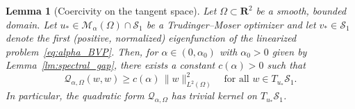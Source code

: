 \documentclass[reqno,11pt]{amsart}
\newtheorem{lemma}[theorem]{Lemma}
\theoremstyle{definition}
\begin{document}
\begin{lemma}[Coercivity on the tangent space]\label{lem:Q_coercivity}
Let $\Omega\subset\mathbf{R}^2$ be a smooth, bounded domain.
Let $u_*\in\mathcal{M}_\alpha(\Omega)\cap\mathcal{S}_1$ be a Trudinger--Moser optimizer and
let $v_*\in\mathcal{S}_1$ denote the first (positive, normalized) eigenfunction
of the linearized problem~\eqref{eq:alpha_BVP}.
Then, for $\alpha\in(0,\alpha_0)$ with $\alpha_0>0$ given by Lemma~\ref{lm:spectral_gap},
there exists a constant $c(\alpha)>0$ such that
\begin{equation}\label{eq:Q_coercivity}
\mathscr{Q}_{\alpha,\Omega}(w,w)\ge c(\alpha)\,\|w\|_{L^2(\Omega)}^2
\quad\text{for all }w\in T_{u_*}\mathcal{S}_1.
\end{equation}
In particular, the quadratic form $\mathscr{Q}_{\alpha,\Omega}$ has trivial kernel on $T_{u_*}\mathcal{S}_1$.
\end{lemma}
\end{document}
